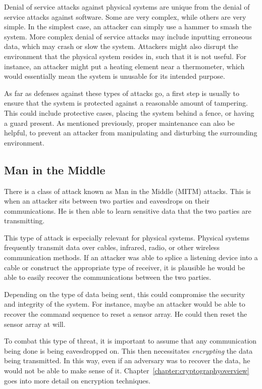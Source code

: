 Denial of service attacks against physical systems are unique from the denial of service attacks against software. Some are very complex,
while others are very simple. In the simplest case, an attacker can simply use a hammer to smash the system. More complex denial of
service attacks may include inputting erroneous data, which may crash or slow the system. Attackers might also disrupt the environment
that the physical system resides in, such that it is not useful. For instance, an attacker might put a heating element near a thermometer,
which would essentially mean the system is unusable for its intended purpose.

As far as defenses against these types of attacks go, a first step is usually to ensure that the system is protected against a reasonable
amount of tampering. This could include protective cases, placing the system behind a fence, or having a guard present. As mentioned
previously, proper maintenance can also be helpful, to prevent an attacker from manipulating and disturbing the surrounding
environment.

\subsection{Man in the Middle}
There is a class of attack known as Man in the Middle (MITM) attacks. This is when an attacker sits between two parties and eavesdrops
on their communications. He is then able to learn sensitive data that the two parties are transmitting.

This type of attack is especially relevant for physical systems. Physical systems frequently transmit data over cables, infrared, radio, or
other wireless communication methods. If an attacker was able to splice a listening device into a cable or construct the appropriate type
of receiver, it is plausible he would be able to easily recover the communications between the two parties. 

Depending on the type of data
being sent, this could compromise the security and integrity of the system. For instance, maybe an attacker would be able to recover the
command sequence to reset a sensor array. He could then reset the sensor array at will.

To combat this type of threat, it is important to assume that any communication being done is being eavesdropped on. This then
necessitates \textit{encrypting} the data being transmitted. In this way, even if an adversary was to recover the data, he would not be
able to make sense of it. Chapter~\ref{chapter:cryptographyoverview} goes into more detail on encryption techniques.

